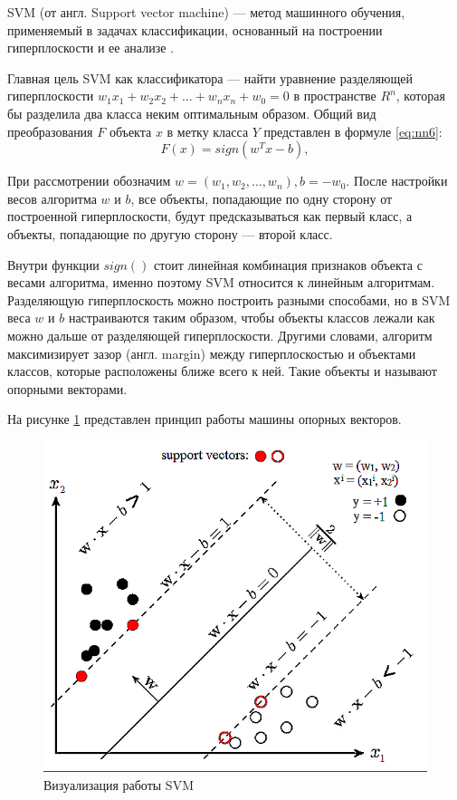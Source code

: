 SVM (от англ. Support vector machine) --- метод машинного обучения, применяемый в задачах классификации, основанный на построении гиперплоскости и ее анализе \cite{svm}.

Главная цель SVM как классификатора --- найти уравнение разделяющей гиперплоскости $w_1x_1+w_2x_2+…+w_nx_n+w_0=0$ в пространстве $R^n$, которая бы разделила два класса неким оптимальным образом. Общий вид преобразования $F$ объекта $x$ в метку класса $Y$ представлен в формуле \ref{eq:nn6}: 
\begin{equation}
	\label{eq:nn6}
	F(x) = sign(w^Tx-b),
\end{equation}

При рассмотрении обозначим $w = (w_1, w_2, …, w_n), b=-w_0$. После настройки весов алгоритма $w$ и $b$, все объекты, попадающие по одну сторону от построенной гиперплоскости, будут предсказываться как первый класс, а объекты, попадающие по другую сторону --- второй класс.

Внутри функции $sign()$ стоит линейная комбинация признаков объекта с весами алгоритма, именно поэтому SVM относится к линейным алгоритмам. Разделяющую гиперплоскость можно построить разными способами, но в SVM веса $w$ и $b$ настраиваются таким образом, чтобы объекты классов лежали как можно дальше от разделяющей гиперплоскости. Другими словами, алгоритм максимизирует зазор (англ. margin) между гиперплоскостью и объектами классов, которые расположены ближе всего к ней. Такие объекты и называют опорными векторами.

На рисунке \ref{fig:svm1} представлен принцип работы машины опорных векторов.

\begin{figure}[H]
	\centering
	\includegraphics[width=\textwidth]{img/svm1.png}
	\caption{Визуализация работы SVM}
	\label{fig:svm1}
\end{figure}

